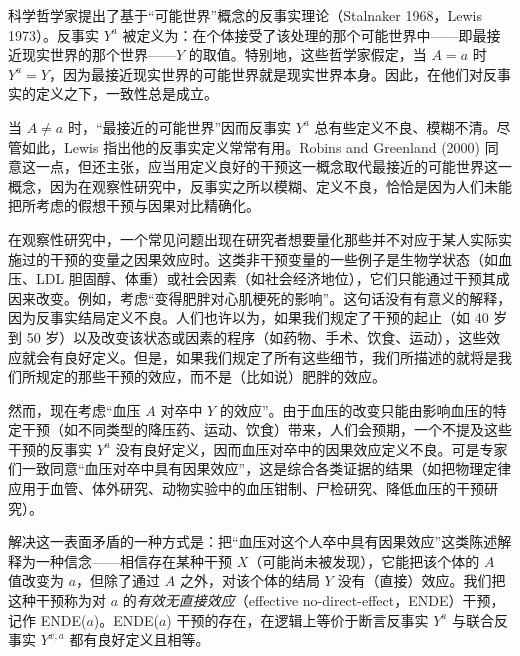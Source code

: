 \renewcommand{\FPname}{精要（Fine Point）}
\begin{finepoint}[可能世界]
科学哲学家提出了基于“可能世界”概念的反事实理论（Stalnaker 1968，Lewis 1973）。反事实 $Y^{a}$ 被定义为：在个体接受了该处理的那个可能世界中——即最接近现实世界的那个世界——$Y$ 的取值。特别地，这些哲学家假定，当 $A=a$ 时 $Y^{a}=Y$，因为最接近现实世界的可能世界就是现实世界本身。因此，在他们对反事实的定义之下，一致性总是成立。

当 $A\neq a$ 时，“最接近的可能世界”因而反事实 $Y^{a}$ 总有些定义不良、模糊不清。尽管如此，Lewis 指出他的反事实定义常常有用。Robins and Greenland (2000) 同意这一点，但还主张，应当用定义良好的干预这一概念取代最接近的可能世界这一概念，因为在观察性研究中，反事实之所以模糊、定义不良，恰恰是因为人们未能把所考虑的假想干预与因果对比精确化。
\end{finepoint}
\renewcommand{\FPname}{精要}

在观察性研究中，一个常见问题出现在研究者想要量化那些并不对应于某人实际实施过的干预的变量之因果效应时。这类非干预变量的一些例子是生物学状态（如血压、LDL 胆固醇、体重）或社会因素（如社会经济地位），它们只能通过干预其成因来改变。例如，考虑“变得肥胖对心肌梗死的影响”。这句话没有有意义的解释，因为反事实结局定义不良。人们也许以为，如果我们规定了干预的起止（如 40 岁到 50 岁）以及改变该状态或因素的程序（如药物、手术、饮食、运动），这些效应就会有良好定义。但是，如果我们规定了所有这些细节，我们所描述的就将是我们所规定的那些干预的效应，而不是（比如说）肥胖的效应。



然而，现在考虑“血压 $A$ 对卒中 $Y$ 的效应”。由于血压的改变只能由影响血压的特定干预（如不同类型的降压药、运动、饮食）带来，人们会预期，一个不提及这些干预的反事实 $Y^{a}$ 没有良好定义，因而血压对卒中的因果效应定义不良。可是专家们一致同意“血压对卒中具有因果效应”，这是综合各类证据的结果（如把物理定律应用于血管、体外研究、动物实验中的血压钳制、尸检研究、降低血压的干预研究）。

解决这一表面矛盾的一种方式是：把“血压对这个人卒中具有因果效应”这类陈述解释为一种信念——相信存在某种干预 $X$（可能尚未被发现），它能把该个体的 $A$ 值改变为 $a$，但除了通过 $A$ 之外，对该个体的结局 $Y$ 没有（直接）效应。我们把这种干预称为对 $a$ 的\emph{有效无直接效应}（effective no-direct-effect，ENDE）干预，记作 ENDE($a$)。ENDE($a$) 干预的存在，在逻辑上等价于断言反事实 $Y^{a}$ 与联合反事实 $Y^{x,a}$ 都有良好定义且相等。

